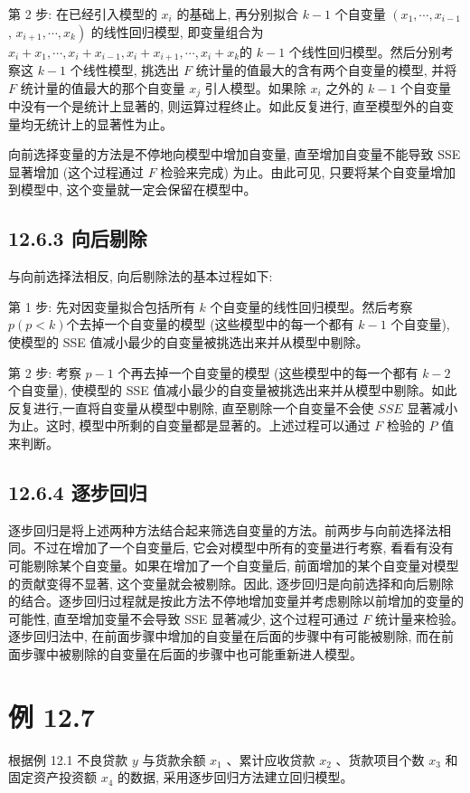 \documentclass[10pt]{article}
\begin{document}
\begin{CJK*}{UTF8}{bsmi}
第 2 步: 在已经引入模型的 $x_{i}$ 的基础上, 再分别拟合 $k-1$ 个自变量 $\left(x_{1}, \cdots, x_{i-1}\right.$, $\left.x_{i+1}, \cdots, x_{k}\right)$ 的线性回归模型, 即变量组合为 $x_{i}+x_{1}, \cdots, x_{i}+x_{i-1}, x_{i}+x_{i+1}, \cdots, x_{i}+x_{k}$的 $k-1$ 个线性回归模型。然后分别考察这 $k-1$ 个线性模型, 挑选出 $F$ 统计量的值最大的含有两个自变量的模型, 并将 $F$ 统计量的值最大的那个自变量 $x_{j}$ 引人模型。如果除 $x_{i}$ 之外的 $k-1$ 个自变量中没有一个是统计上显著的, 则运算过程终止。如此反复进行, 直至模型外的自变量均无统计上的显著性为止。

向前选择变量的方法是不停地向模型中增加自变量, 直至增加自变量不能导致 SSE 显著增加 (这个过程通过 $F$ 检验来完成) 为止。由此可见, 只要将某个自变量增加到模型中, 这个变量就一定会保留在模型中。

\subsection*{12.6.3 向后剔除}
与向前选择法相反, 向后剔除法的基本过程如下:

第 1 步: 先对因变量拟合包括所有 $k$ 个自变量的线性回归模型。然后考察 $p(p<k)$个去掉一个自变量的模型 (这些模型中的每一个都有 $k-1$ 个自变量), 使模型的 SSE 值减小最少的自变量被挑选出来并从模型中剔除。

第 2 步: 考察 $p-1$ 个再去掉一个自变量的模型 (这些模型中的每一个都有 $k-2$ 个自变量), 使模型的 SSE 值减小最少的自变量被挑选出来并从模型中剔除。如此反复进行,一直将自变量从模型中剔除, 直至剔除一个自变量不会使 $S S E$ 显著减小为止。这时, 模型中所剩的自变量都是显著的。上述过程可以通过 $F$ 检验的 $P$ 值来判断。

\subsection*{12.6.4 逐步回归}
逐步回归是将上述两种方法结合起来筛选自变量的方法。前两步与向前选择法相同。不过在增加了一个自变量后, 它会对模型中所有的变量进行考察, 看看有没有可能剔除某个自变量。如果在增加了一个自变量后, 前面增加的某个自变量对模型的贡献变得不显著, 这个变量就会被剔除。因此, 逐步回归是向前选择和向后剔除的结合。逐步回归过程就是按此方法不停地增加变量并考虑剔除以前增加的变量的可能性, 直至增加变量不会导致 SSE 显著减少, 这个过程可通过 $F$ 统计量来检验。逐步回归法中, 在前面步骤中增加的自变量在后面的步骤中有可能被剔除, 而在前面步骤中被剔除的自变量在后面的步骤中也可能重新进人模型。

\section*{例 12.7}
根据例 12.1 不良贷款 $y$ 与货款余额 $x_{1}$ 、累计应收贷款 $x_{2}$ 、货款项目个数 $x_{3}$ 和固定资产投资额 $x_{4}$ 的数据, 采用逐步回归方法建立回归模型。


\end{CJK*}
\end{document}
